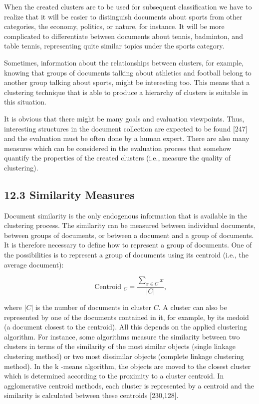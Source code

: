 \documentclass[10pt]{book}
\begin{document}
When the created clusters are to be used for subsequent classification we have to realize that it will be easier to distinguish documents about sports from other categories, the economy, politics, or nature, for instance. It will be more complicated to differentiate between documents about tennis, badminton, and table tennis, representing quite similar topics under the sports category.

Sometimes, information about the relationships between clusters, for example, knowing that groups of documents talking about athletics and football belong to another group talking about sports, might be interesting too. This means that a clustering technique that is able to produce a hierarchy of clusters is suitable in this situation.

It is obvious that there might be many goals and evaluation viewpoints. Thus, interesting structures in the document collection are expected to be found [247] and the evaluation must be often done by a human expert. There are also many measures which can be considered in the evaluation process that somehow quantify the properties of the created clusters (i.e., measure the quality of clustering).

\subsection*{12.3 Similarity Measures}
Document similarity is the only endogenous information that is available in the clustering process. The similarity can be measured between individual documents, between groups of documents, or between a document and a group of documents. It is therefore necessary to define how to represent a group of documents. One of the possibilities is to represent a group of documents using its centroid (i.e., the average document):


\begin{equation*}
\text { Centroid }_{C}=\frac{\sum_{x \in C} x}{|C|}, \tag{12.1}
\end{equation*}


where $|C|$ is the number of documents in cluster $C$. A cluster can also be represented by one of the documents contained in it, for example, by its medoid (a document closest to the centroid). All this depends on the applied clustering algorithm. For instance, some algorithms measure the similarity between two clusters in terms of the similarity of the most similar objects (single linkage clustering method) or two most dissimilar objects (complete linkage clustering method). In the k -means algorithm, the objects are moved to the closest cluster which is determined according to the proximity to a cluster centroid. In agglomerative centroid methods, each cluster is represented by a centroid and the similarity is calculated between these centroids [230,128].
\end{document}
